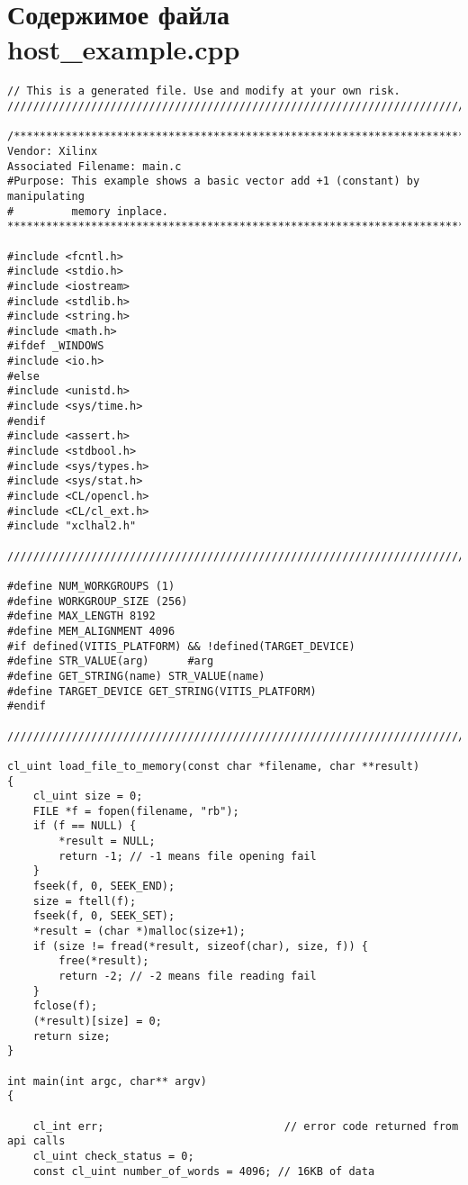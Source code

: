 \chapter{Содержимое файла host\_example.cpp}
\label{cha:appendix1}

\begin{lstlisting}[label=code:hostexample3, caption=Содержимое файла host\_example.cpp, breakatwhitespace=false]
// This is a generated file. Use and modify at your own risk.
////////////////////////////////////////////////////////////////////////////////

/*******************************************************************************
Vendor: Xilinx
Associated Filename: main.c
#Purpose: This example shows a basic vector add +1 (constant) by manipulating
#         memory inplace.
*******************************************************************************/

#include <fcntl.h>
#include <stdio.h>
#include <iostream>
#include <stdlib.h>
#include <string.h>
#include <math.h>
#ifdef _WINDOWS
#include <io.h>
#else
#include <unistd.h>
#include <sys/time.h>
#endif
#include <assert.h>
#include <stdbool.h>
#include <sys/types.h>
#include <sys/stat.h>
#include <CL/opencl.h>
#include <CL/cl_ext.h>
#include "xclhal2.h"

////////////////////////////////////////////////////////////////////////////////

#define NUM_WORKGROUPS (1)
#define WORKGROUP_SIZE (256)
#define MAX_LENGTH 8192
#define MEM_ALIGNMENT 4096
#if defined(VITIS_PLATFORM) && !defined(TARGET_DEVICE)
#define STR_VALUE(arg)      #arg
#define GET_STRING(name) STR_VALUE(name)
#define TARGET_DEVICE GET_STRING(VITIS_PLATFORM)
#endif

////////////////////////////////////////////////////////////////////////////////

cl_uint load_file_to_memory(const char *filename, char **result)
{
    cl_uint size = 0;
    FILE *f = fopen(filename, "rb");
    if (f == NULL) {
        *result = NULL;
        return -1; // -1 means file opening fail
    }
    fseek(f, 0, SEEK_END);
    size = ftell(f);
    fseek(f, 0, SEEK_SET);
    *result = (char *)malloc(size+1);
    if (size != fread(*result, sizeof(char), size, f)) {
        free(*result);
        return -2; // -2 means file reading fail
    }
    fclose(f);
    (*result)[size] = 0;
    return size;
}

int main(int argc, char** argv)
{

    cl_int err;                            // error code returned from api calls
    cl_uint check_status = 0;
    const cl_uint number_of_words = 4096; // 16KB of data



\end{lstlisting}
